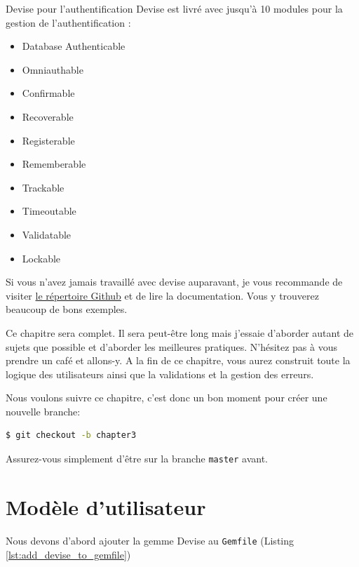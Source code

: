 \documentclass[]{report}
\begin{document}
  \begin{tcolorbox}{Devise pour l'authentification}\label{box:devise_for_authentification}
    Devise est livré avec jusqu'à 10 modules pour la gestion de l'authentification :

    \begin{itemize}
      \item Database Authenticable
      \item Omniauthable
      \item Confirmable
      \item Recoverable
      \item Registerable
      \item Rememberable
      \item Trackable
      \item Timeoutable
      \item Validatable
      \item Lockable
    \end{itemize}

    Si vous n'avez jamais travaillé avec devise auparavant, je vous recommande de visiter \href{https://github.com/plataformatec/devise}{le répertoire Github} et de lire la documentation. Vous y trouverez beaucoup de bons exemples.
  \end{tcolorbox}

  Ce chapitre sera complet. Il sera peut-être long mais j'essaie d'aborder autant de sujets que possible et d'aborder les meilleures pratiques. N'hésitez pas à vous prendre un café et allons-y. A la fin de ce chapitre, vous aurez construit toute la logique des utilisateurs ainsi que la validations et la gestion des erreurs.

  Nous voulons suivre ce chapitre, c'est donc un bon moment pour créer une nouvelle branche:

  \begin{scriptsize}
    \begin{lstlisting}[language=bash]
    $ git checkout -b chapter3
    \end{lstlisting}
  \end{scriptsize}

  Assurez-vous simplement d'être sur la branche \verb|master| avant.

  \section{Modèle d'utilisateur}

    Nous devons d'abord ajouter la gemme Devise au \verb|Gemfile| (Listing \ref{lst:add_devise_to_gemfile})
\end{document}

